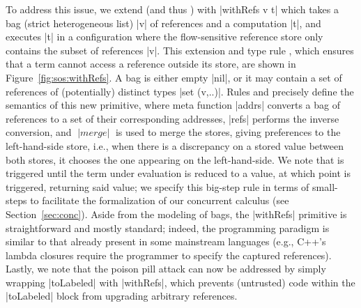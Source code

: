 To address this issue, we extend \liofs{} (and thus \lioafs{}) with |withRefs v
t| which takes a bag (strict heterogeneous list) |v| of references and a computation |t|, and executes |t|
in a configuration where the flow-sensitive reference store only contains the
subset of references |v|.
%
%
This extension and type rule , which ensures that a term
cannot access a reference outside its store, are shown in
Figure~\ref{fig:sos:withRefs}. 
%
A bag is either empty |nil|, or it may contain a set of references
of (potentially) distinct types |set (v,..)|.
%
Rules  and  precisely define the
semantics of this new primitive, where meta function |addrs| converts a bag of
references to a set of their corresponding addresses, |refs| performs the
inverse conversion, and $\;|merge|\;$ is used to merge the stores, giving preferences
to the left-hand-side store, i.e., when there is a discrepancy on a stored
value between both stores, it chooses the one appearing on the left-hand-side.
%
We note that  is triggered until the term under
evaluation is reduced to a value, at which point  is
triggered, returning said value; we specify this big-step rule in terms of
small-steps to facilitate the formalization of our concurrent calculus (see
Section~\ref{sec:conc}).
% 
Aside from the modeling of bags, the |withRefs| primitive is
straightforward and mostly standard;
indeed, the programming paradigm is similar to that already present in
some mainstream languages (e.g., C++'s lambda closures require the
programmer to specify the captured references).
%
Lastly, we note that the poison pill attack can now be addressed by
simply wrapping |toLabeled| with |withRefs|, which prevents
(untrusted) code within the |toLabeled| block from upgrading arbitrary
references. 



